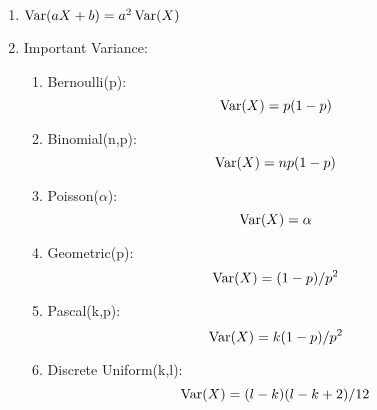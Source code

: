 \begin{enumerate}
{\begin{enumerate}
            \item $\mathop{\mathrm{Var}}\nolimits(aX+b)=a^2\mathop{\mathrm{Var}}\nolimits(X)$
            \item Important Variance:{
                \begin{enumerate}
                    \item Bernoulli(p): $$\mathop{\mathrm{Var}}\nolimits(X)=p(1-p)$$
                    \item Binomial(n,p): $$\mathop{\mathrm{Var}}\nolimits(X)=np(1-p)$$
                    \item Poisson($\alpha$): $$\mathop{\mathrm{Var}}\nolimits(X)=\alpha$$
                    \item Geometric(p): $$\mathop{\mathrm{Var}}\nolimits(X)=(1-p)/p^2$$
                    \item Pascal(k,p): $$\mathop{\mathrm{Var}}\nolimits(X)=k(1-p)/p^2$$
                    \item Discrete Uniform(k,l): $$\mathop{\mathrm{Var}}\nolimits(X)=(l-k)(l-k+2)/12$$
                \end{enumerate}
            }
        \end{enumerate}
    }
\end{enumerate}